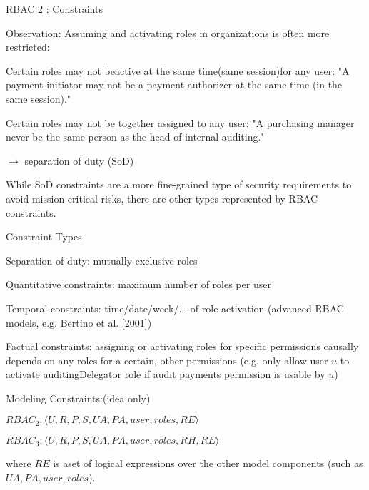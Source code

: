 \documentclass[a4paper]{article}
\begin{document}
\begin{multicols}{3}
    RBAC 2 : Constraints
    \begin{itemize*}
        \item Observation: Assuming and activating roles in organizations is often more restricted:
              \begin{itemize*}
                  \item Certain roles may not beactive at the same time(same session)for any user: "A payment initiator may not be a payment authorizer at the same time (in the same session)."
                  \item Certain roles may not be together assigned to any user: "A purchasing manager never be the same person as the head of internal auditing."
                  \item $\rightarrow$ separation of duty (SoD)
                  \item While SoD constraints are a more fine-grained type of security requirements to avoid mission-critical risks, there are other types represented by RBAC constraints.
              \end{itemize*}
        \item Constraint Types
              \begin{itemize*}
                  \item Separation of duty: mutually exclusive roles
                  \item Quantitative constraints: maximum number of roles per user
                  \item Temporal constraints: time/date/week/... of role activation (advanced RBAC models, e.g. Bertino et al. [2001])
                  \item Factual constraints: assigning or activating roles for specific permissions causally depends on any roles for a certain, other permissions (e.g. only allow user $u$ to activate auditingDelegator role if audit payments permission is usable by $u$)
              \end{itemize*}
        \item Modeling Constraints:(idea only)
              \begin{itemize*}
                  \item $RBAC_2 : ⟨U,R,P,S,UA,PA,user,roles,RE⟩$
                  \item $RBAC_3 : ⟨U,R,P,S,UA,PA,user,roles,RH,RE⟩$
                  \item where $RE$ is aset of logical expressions over the other model components (such as $UA,PA,user,roles$).
              \end{itemize*}
    \end{itemize*}


\end{multicols}
\end{document}
